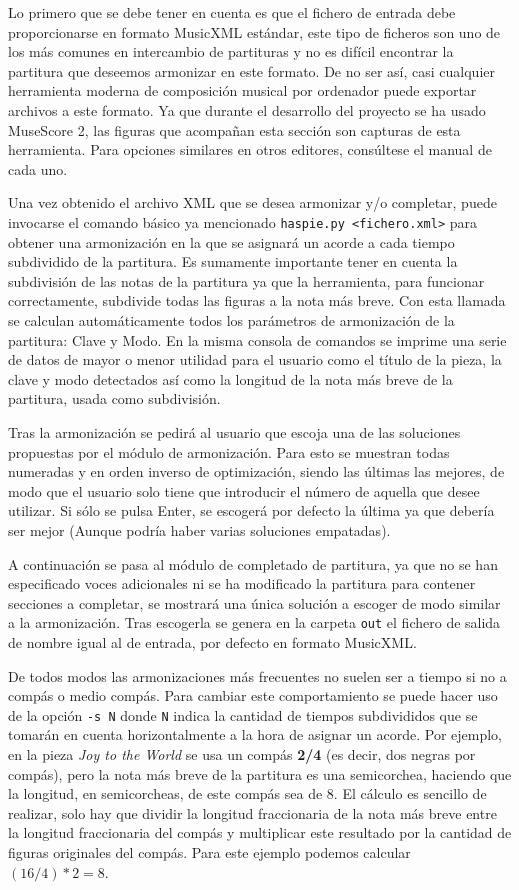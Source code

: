 Lo primero que se debe tener en cuenta es que el fichero de entrada debe proporcionarse en formato MusicXML estándar, este tipo de ficheros son uno de los más comunes en intercambio de partituras y no es difícil encontrar la partitura que deseemos armonizar en este formato. De no ser así, casi cualquier herramienta moderna de composición musical por ordenador puede exportar archivos a este formato. Ya que durante el desarrollo del proyecto se ha usado MuseScore 2, las figuras que acompañan esta sección son capturas de esta herramienta. Para opciones similares en otros editores, consúltese el manual de cada uno.

Una vez obtenido el archivo XML que se desea armonizar y/o completar, puede invocarse el comando básico ya mencionado \texttt{haspie.py <fichero.xml>} para obtener una armonización en la que se asignará un acorde a cada tiempo subdividido de la partitura. Es sumamente importante tener en cuenta la subdivisión de las notas de la partitura ya que la herramienta, para funcionar correctamente, subdivide todas las figuras a la nota más breve. Con esta llamada se calculan automáticamente todos los parámetros de armonización de la partitura: Clave y Modo. En la misma consola de comandos se imprime una serie de datos de mayor o menor utilidad para el usuario como el título de la pieza, la clave y modo detectados así como la longitud de la nota más breve de la partitura, usada como subdivisión. 

Tras la armonización se pedirá al usuario que escoja una de las soluciones propuestas por el módulo de armonización. Para esto se muestran todas numeradas y en orden inverso de optimización, siendo las últimas las mejores, de modo que el usuario solo tiene que introducir el número de aquella que desee utilizar. Si sólo se pulsa Enter, se escogerá por defecto la última ya que debería ser mejor (Aunque podría haber varias soluciones empatadas).

A continuación se pasa al módulo de completado de partitura, ya que no se han especificado voces adicionales ni se ha modificado la partitura para contener secciones a completar, se mostrará una única solución a escoger de modo similar a la armonización. Tras escogerla se genera en la carpeta \texttt{out} el fichero de salida de nombre igual al de entrada, por defecto en formato MusicXML.

De todos modos las armonizaciones más frecuentes no suelen ser a tiempo si no a compás o medio compás. Para cambiar este comportamiento se puede hacer uso de la opción \texttt{-s N} donde \texttt{N} indica la cantidad de tiempos subdivididos que se tomarán en cuenta horizontalmente a la hora de asignar un acorde. Por ejemplo, en la pieza \textit{Joy to the World} se usa un compás \textbf{2/4} (es decir, dos negras por compás), pero la nota más breve de la partitura es una semicorchea, haciendo que la longitud, en semicorcheas, de este compás sea de 8. El cálculo es sencillo de realizar, solo hay que dividir la longitud fraccionaria de la nota más breve entre la longitud fraccionaria del compás y multiplicar este resultado por la cantidad de figuras originales del compás. Para este ejemplo podemos calcular $(16/4)*2=8$.

